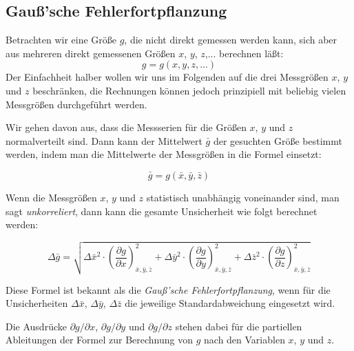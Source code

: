 \subsection{Gauß'sche Fehlerfortpflanzung}\label{chap:Fehlerfortpflanzung}

Betrachten wir eine Größe $g$, die nicht direkt gemessen werden kann, sich aber aus mehreren direkt gemessenen Größen $x$, $y$, $z$,... berechnen läßt:
\begin{equation}
	g = g(x,y,z,...)
\end{equation}
Der Einfachheit halber wollen wir uns im Folgenden auf die drei Messgrößen $x$, $y$ und $z$ beschränken, die Rechnungen können jedoch prinzipiell mit beliebig vielen Messgrößen durchgeführt werden.

Wir gehen davon aus, dass die Messserien für die Größen $x$, $y$ und $z$ normalverteilt sind. Dann kann der Mittelwert $\bar{g}$ der gesuchten Größe bestimmt werden, indem man die Mittelwerte der Messgrößen in die Formel einsetzt:
\begin{hint}
	\begin{equation}
		\bar{g} = g(\bar{x},\bar{y},\bar{z})
	\end{equation}
\end{hint}

Wenn die Messgrößen $x$, $y$ und $z$ statistisch unabhängig voneinander sind, man sagt \textit{unkorreliert}, dann kann die gesamte Unsicherheit wie folgt berechnet werden:
\begin{hint}
	\begin{equation}
		\Delta\bar{g} = \sqrt{\Delta\bar{x}^2 \cdot \left(\frac{\partial g}{\partial x} \right)^2_{\bar{x},\bar{y},\bar{z}} + \Delta\bar{y}^2 \cdot \left(\frac{\partial g}{\partial y} \right)^2_{\bar{x},\bar{y},\bar{z}} + \Delta\bar{z}^2 \cdot \left(\frac{\partial g}{\partial z} \right)^2_{\bar{x},\bar{y},\bar{z}}}
	\end{equation}
\end{hint}

Diese Formel ist bekannt als die \textit{Gauß'sche Fehlerfortpflanzung}, wenn für die Unsicherheiten $\Delta\bar{x}$, $\Delta\bar{y}$, $\Delta\bar{z}$ die jeweilige Standardabweichung eingesetzt wird.

Die Ausdrücke $\partial g/\partial x$, $\partial g/\partial y$ und $\partial g/\partial z$ stehen dabei für die partiellen Ableitungen der Formel zur Berechnung von $g$ nach den Variablen $x$, $y$ und $z$.

